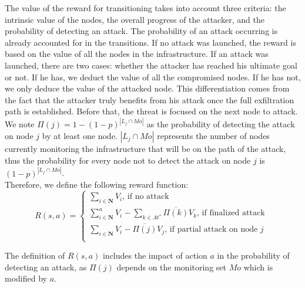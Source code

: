 The value of the reward for transitioning takes into account three criteria: the intrinsic value of the nodes, the overall progress of the attacker, and the probability of detecting an attack. The probability of an attack occurring is already accounted for in the transitions.
If no attack was launched, the reward is based on the value of all the nodes in the infrastructure. 
If an attack was launched, there are two cases: whether the attacker has reached his ultimate goal or not.
If he has, we deduct the value of all the compromised nodes. If he has not, we only deduce the value of the attacked node.
This differentiation comes from the fact that the attacker truly benefits from his attack once the full exfiltration path is established. Before that, the threat is focused on the next node to attack.
\\We note $\Pi(j)=1 - (1-p)^{|L_j \cap Mo|}$ as the probability of detecting the attack on node $j$ by at least one node. $|L_j \cap Mo|$ represents the number of nodes currently monitoring the infrastructure that will be on the path of the attack, thus the probability for every node not to detect the attack on node $j$ is $(1-p)^{|L_j \cap Mo|}$.
\\
Therefore, we define the following reward function: %
\\
\begin{equation}
  R(s,a) =\begin{cases}
    \sum\limits_{i\in \textbf{N}} V_i \text{, if no attack}\\
    \sum\limits_{i\in \textbf{N}}^n V_i - \sum\limits_{k \in At^s} \overline{\Pi(k)}V_k \text{, if finalized attack }\\
    \sum\limits_{i\in \textbf{N}} V_i - \overline{\Pi(j)}V_j \text{, if partial attack on node $j$}\\
  \end{cases}
\end{equation}

The definition of $R(s,a)$ includes the impact of action $a$ in the probability of detecting an attack, as $\Pi(j)$ depends on the monitoring set $Mo$ which is modified by $a$.